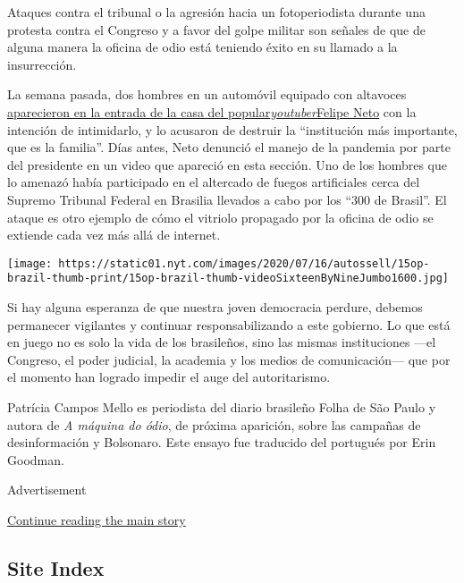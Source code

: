 Ataques contra el tribunal o la agresión hacia un fotoperiodista durante
una protesta contra el Congreso y a favor del golpe militar son señales
de que de alguna manera la oficina de odio está teniendo éxito en su
llamado a la insurrección.

La semana pasada, dos hombres en un automóvil equipado con altavoces
\href{https://esportes.yahoo.com/noticias/aliados-jair-bolsonaro-atacam-casa-felipe-neto-010129218.html}{aparecieron
en la entrada de la casa del
popular}\href{https://esportes.yahoo.com/noticias/aliados-jair-bolsonaro-atacam-casa-felipe-neto-010129218.html}{\emph{youtuber}}\href{https://esportes.yahoo.com/noticias/aliados-jair-bolsonaro-atacam-casa-felipe-neto-010129218.html}{Felipe
Neto} con la intención de intimidarlo, y lo acusaron de destruir la
``institución más importante, que es la familia''. Días antes, Neto
denunció el manejo de la pandemia por parte del presidente en un video
que apareció en esta sección. Uno de los hombres que lo amenazó había
participado en el altercado de fuegos artificiales cerca del Supremo
Tribunal Federal en Brasilia llevados a cabo por los ``300 de Brasil''.
El ataque es otro ejemplo de cómo el vitriolo propagado por la oficina
de odio se extiende cada vez más allá de internet.

\texttt{[image: https://static01.nyt.com/images/2020/07/16/autossell/15op-brazil-thumb-print/15op-brazil-thumb-videoSixteenByNineJumbo1600.jpg]}

Si hay alguna esperanza de que nuestra joven democracia perdure, debemos
permanecer vigilantes y continuar responsabilizando a este gobierno. Lo
que está en juego no es solo la vida de los brasileños, sino las mismas
instituciones ---el Congreso, el poder judicial, la academia y los
medios de comunicación--- que por el momento han logrado impedir el auge
del autoritarismo.

Patrícia Campos Mello es periodista del diario brasileño Folha de São
Paulo y autora de \emph{A máquina do ódio}, de próxima aparición, sobre
las campañas de desinformación y Bolsonaro. Este ensayo fue traducido
del portugués por Erin Goodman.

Advertisement

\protect\hyperlink{after-bottom}{Continue reading the main story}

\hypertarget{site-index}{%
\subsection{Site Index}\label{site-index}}

